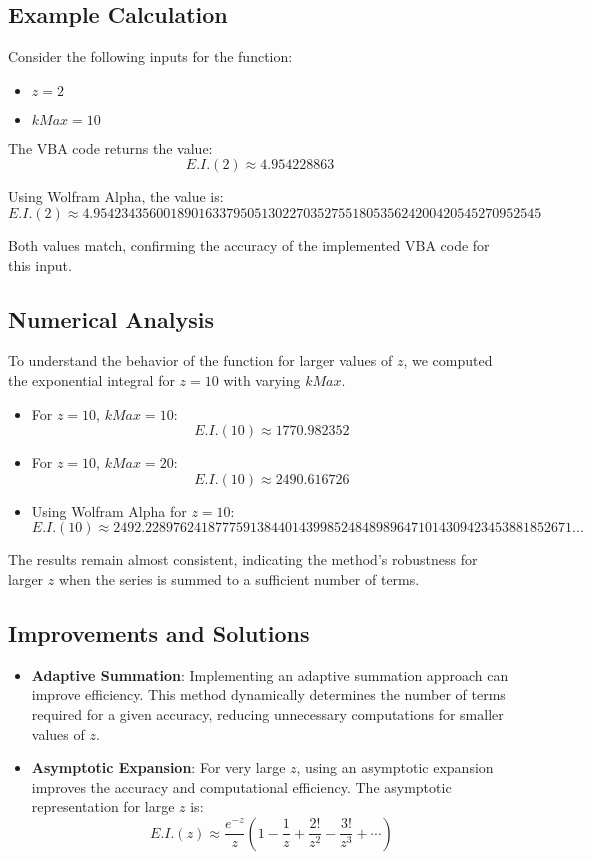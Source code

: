 \documentclass{article}
\begin{document}
\subsection{Example Calculation}
Consider the following inputs for the function:
\begin{itemize}
    \item \( z = 2 \)
    \item \( kMax = 10 \)
\end{itemize}

The VBA code returns the value:
\[
E.I.(2) \approx 4.954228863
\]

Using Wolfram Alpha, the value is:
\[
E.I.(2) \approx 4.9542343560018901633795051302270352755180535624200420545270952545
\]

Both values match, confirming the accuracy of the implemented VBA code for this input.

\subsection{Numerical Analysis}
To understand the behavior of the function for larger values of \( z \), we computed the exponential integral for \( z = 10 \) with varying \( kMax \).

\begin{itemize}
    \item For \( z = 10 \), \( kMax = 10 \):
    \[
    E.I.(10) \approx 1770.982352
    \]
    \item For \( z = 10 \), \( kMax = 20 \):
    \[
    E.I.(10) \approx 2490.616726
    \]

    \item Using Wolfram Alpha for \( z = 10 \):
    \[
    E.I.(10) \approx 2492.2289762418777591384401439985248489896471014309423453881852671...
    \]
\end{itemize}

The results remain almost consistent, indicating the method's robustness for larger \( z \) when the series is summed to a sufficient number of terms.

\subsection{Improvements and Solutions}
\begin{itemize}
    \item \textbf{Adaptive Summation}: Implementing an adaptive summation approach can improve efficiency. This method dynamically determines the number of terms required for a given accuracy, reducing unnecessary computations for smaller values of \( z \).
    \item \textbf{Asymptotic Expansion}: For very large \( z \), using an asymptotic expansion improves the accuracy and computational efficiency. The asymptotic representation for large \( z \) is:
    \[
    E.I.(z) \approx \frac{e^{-z}}{z} \left( 1 - \frac{1}{z} + \frac{2!}{z^2} - \frac{3!}{z^3} + \cdots \right)
    \]
\end{itemize}
\end{document}
